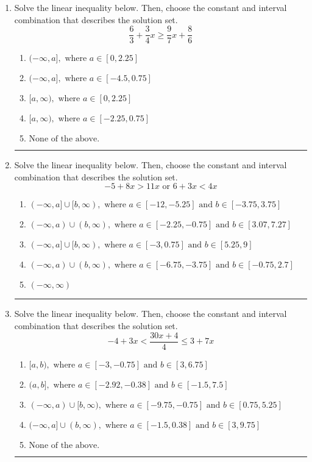 \documentclass[14pt]{extbook}
\newcommand{\litem}[1]{\item#1\hspace*{-1cm}\rule{\textwidth}{0.4pt}}
\begin{document}
\begin{enumerate}
{\begin{enumerate}[label=\Alph*.]
\end{enumerate} }
\litem{
Solve the linear inequality below. Then, choose the constant and interval combination that describes the solution set.\[ \frac{6}{3} + \frac{3}{4} x \geq \frac{9}{7} x + \frac{8}{6} \]\begin{enumerate}[label=\Alph*.]
\item \( (-\infty, a], \text{ where } a \in [0, 2.25] \)
\item \( (-\infty, a], \text{ where } a \in [-4.5, 0.75] \)
\item \( [a, \infty), \text{ where } a \in [0, 2.25] \)
\item \( [a, \infty), \text{ where } a \in [-2.25, 0.75] \)
\item \( \text{None of the above}. \)

\end{enumerate} }
\litem{
Solve the linear inequality below. Then, choose the constant and interval combination that describes the solution set.\[ -5 + 8 x > 11 x \text{ or } 6 + 3 x < 4 x \]\begin{enumerate}[label=\Alph*.]
\item \( (-\infty, a] \cup [b, \infty), \text{ where } a \in [-12, -5.25] \text{ and } b \in [-3.75, 3.75] \)
\item \( (-\infty, a) \cup (b, \infty), \text{ where } a \in [-2.25, -0.75] \text{ and } b \in [3.07, 7.27] \)
\item \( (-\infty, a] \cup [b, \infty), \text{ where } a \in [-3, 0.75] \text{ and } b \in [5.25, 9] \)
\item \( (-\infty, a) \cup (b, \infty), \text{ where } a \in [-6.75, -3.75] \text{ and } b \in [-0.75, 2.7] \)
\item \( (-\infty, \infty) \)

\end{enumerate} }
\litem{
Solve the linear inequality below. Then, choose the constant and interval combination that describes the solution set.\[ -4 + 3 x < \frac{30 x + 4}{4} \leq 3 + 7 x \]\begin{enumerate}[label=\Alph*.]
\item \( [a, b), \text{ where } a \in [-3, -0.75] \text{ and } b \in [3, 6.75] \)
\item \( (a, b], \text{ where } a \in [-2.92, -0.38] \text{ and } b \in [-1.5, 7.5] \)
\item \( (-\infty, a) \cup [b, \infty), \text{ where } a \in [-9.75, -0.75] \text{ and } b \in [0.75, 5.25] \)
\item \( (-\infty, a] \cup (b, \infty), \text{ where } a \in [-1.5, 0.38] \text{ and } b \in [3, 9.75] \)
\item \( \text{None of the above.} \)


\end{enumerate}}
\end{enumerate}
\end{document}
